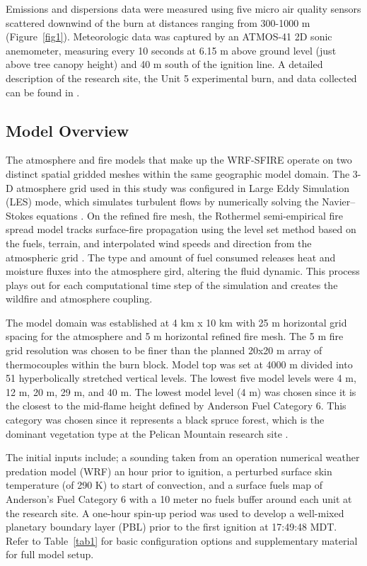 \documentclass[preprints,article,accept,moreauthors,pdftex]{Definitions/mdpi}
\begin{document}
Emissions and dispersions data were measured using five micro air quality sensors scattered downwind of the burn at distances ranging from 300-1000 m (Figure~\ref{fig1}). Meteorologic data was captured by an ATMOS-41 2D sonic anemometer, measuring every 10 seconds at 6.15 m above ground level (just above tree canopy height) and 40 m south of the ignition line. A detailed description of the research site, the Unit 5 experimental burn, and data collected can be found in \cite{thompson_recent_2020,thompson_data_2020,huda_study_2020}.

\subsection{Model Overview}

The atmosphere and fire models that make up the WRF-SFIRE operate on two distinct spatial gridded meshes within the same geographic model domain. The 3-D atmosphere grid used in this study was configured in Large Eddy Simulation (LES) mode, which simulates turbulent flows by numerically solving the Navier–Stokes equations \cite{mandel_coupled_2011,mandel_recent_2014}. On the refined fire mesh, the Rothermel semi-empirical fire spread model tracks surface-fire propagation using the level set method based on the fuels, terrain, and interpolated wind speeds and direction from the atmospheric grid \cite{mandel_coupled_2011,mandel_recent_2014,munozesparza_accurate_2018}. The type and amount of fuel consumed releases heat and moisture fluxes into the atmosphere gird, altering the fluid dynamic. This process plays out for each computational time step of the simulation and creates the wildfire and atmosphere coupling.

The model domain was established at 4 km x 10 km with 25 m horizontal grid spacing for the atmosphere and 5 m horizontal refined fire mesh. The 5 m fire grid resolution was chosen to be finer than the planned 20x20 m array of thermocouples within the burn block. Model top was set at 4000 m divided into 51 hyperbolically stretched vertical levels. The lowest five model levels were 4 m, 12 m, 20 m, 29 m, and 40 m. The lowest model level (4 m) was chosen since it is the closest to the mid-flame height defined by Anderson Fuel Category 6. This category was chosen since it represents a black spruce forest, which is the dominant vegetation type at the Pelican Mountain research site \cite{anderson_aids_1982}.

The initial inputs include; a sounding taken from an operation numerical weather predation model (WRF) an hour prior to ignition, a perturbed surface skin temperature (of 290 K) to start of convection, and a surface fuels map of Anderson’s Fuel Category 6 with a 10 meter no fuels buffer around each unit at the research site. A one-hour spin-up period was used to develop a well-mixed planetary boundary layer (PBL) prior to the first ignition at 17:49:48 MDT. Refer to Table~\ref{tab1} for basic configuration options and supplementary material for full model setup.
\end{document}
